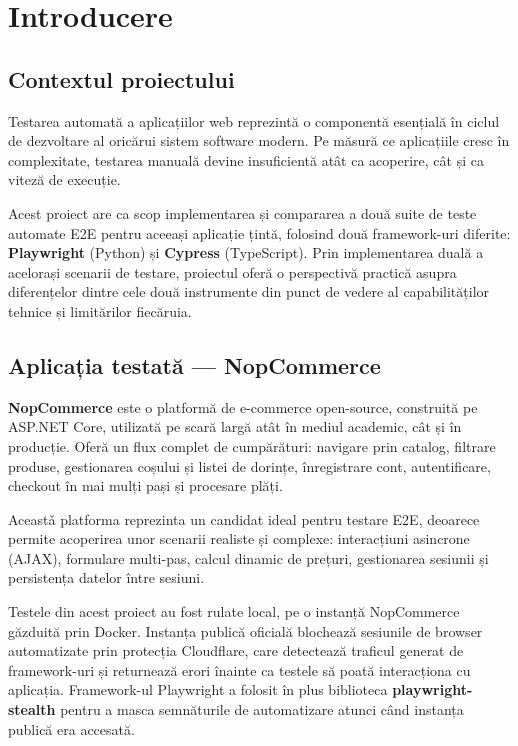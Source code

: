 \chapter{Introducere}

\section{Contextul proiectului}

Testarea automată a aplicațiilor web reprezintă o componentă esențială în ciclul de dezvoltare
al oricărui sistem software modern. Pe măsură ce aplicațiile cresc în complexitate, testarea
manuală devine insuficientă atât ca acoperire, cât și ca viteză de execuție.

Acest proiect are ca scop implementarea și compararea a două suite de teste automate E2E
pentru aceeași aplicație țintă, folosind două framework-uri diferite: \textbf{Playwright}
(Python) și \textbf{Cypress} (TypeScript). Prin implementarea duală a acelorași scenarii de
testare, proiectul oferă o perspectivă practică asupra diferențelor dintre cele două
instrumente din punct de vedere al capabilităților tehnice și limitărilor fiecăruia.

\section{Aplicația testată --- NopCommerce}

\textbf{NopCommerce} este o platformă de e-commerce open-source, construită pe ASP.NET Core,
utilizată pe scară largă atât în mediul academic, cât și în producție. Oferă un flux complet
de cumpărături: navigare prin catalog, filtrare produse, gestionarea coșului și listei de
dorințe, înregistrare cont, autentificare, checkout în mai mulți pași și procesare plăți.

Aceastǎ platforma reprezinta un candidat ideal pentru testare E2E, deoarece permite
acoperirea unor scenarii realiste și complexe: interacțiuni asincrone (AJAX), formulare
multi-pas, calcul dinamic de prețuri, gestionarea sesiunii și persistența datelor între
sesiuni.

Testele din acest proiect au fost rulate local, pe o instanță NopCommerce găzduită prin Docker. Instanța publică oficială blochează sesiunile de browser automatizate prin protecția Cloudflare, care detectează traficul generat de framework-uri și returnează erori înainte ca testele să poată interacționa cu aplicația. Framework-ul Playwright a folosit în plus biblioteca \textbf{playwright-stealth} pentru a masca semnăturile de automatizare atunci când instanța publică era accesată.

